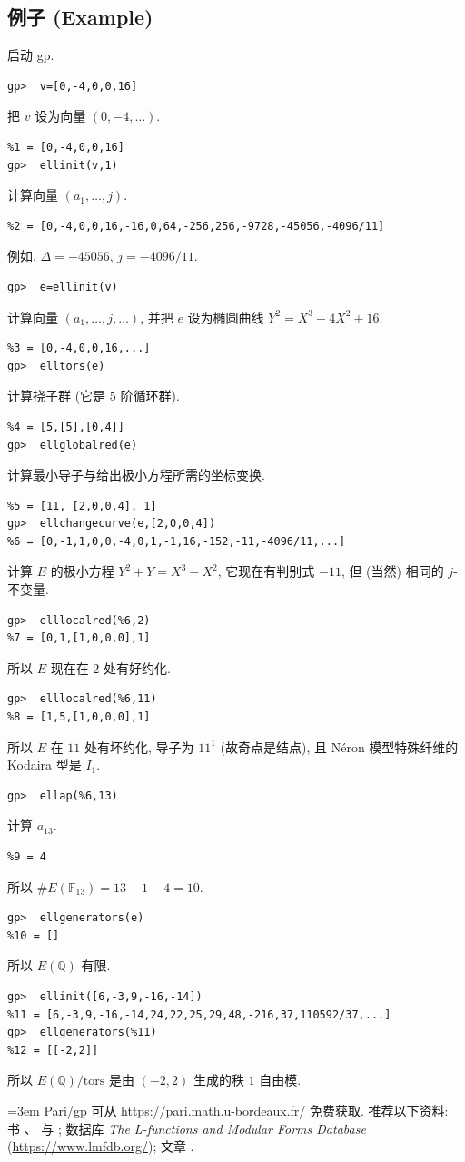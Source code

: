 \subsection*{例子 (Example)}

启动 gp.
\begin{verbatim}
gp>  v=[0,-4,0,0,16]
\end{verbatim}
把 $v$ 设为向量 $(0,-4,\dots)$.
\begin{verbatim}
%1 = [0,-4,0,0,16]
gp>  ellinit(v,1)
\end{verbatim}
计算向量 $(a_1,\dots,j)$.
\begin{verbatim}
%2 = [0,-4,0,0,16,-16,0,64,-256,256,-9728,-45056,-4096/11]
\end{verbatim}
例如, $\Delta = -45056$, $j = -4096/11$.
\begin{verbatim}
gp>  e=ellinit(v)
\end{verbatim}
计算向量 $(a_1,\dots,j,\dots)$, 并把 $e$ 设为椭圆曲线 $Y^2 = X^3 - 4X^2 + 16$.
\begin{verbatim}
%3 = [0,-4,0,0,16,...]
gp>  elltors(e)
\end{verbatim}
计算挠子群 (它是 $5$ 阶循环群).
\begin{verbatim}
%4 = [5,[5],[0,4]]
gp>  ellglobalred(e)
\end{verbatim}
计算最小导子与给出极小方程所需的坐标变换.
\begin{verbatim}
%5 = [11, [2,0,0,4], 1]
gp>  ellchangecurve(e,[2,0,0,4])
%6 = [0,-1,1,0,0,-4,0,1,-1,16,-152,-11,-4096/11,...]
\end{verbatim}
计算 $E$ 的极小方程 $Y^2 + Y = X^3 - X^2$, 它现在有判别式 $-11$, 但 (当然) 相同的 $j$-不变量.
\begin{verbatim}
gp>  elllocalred(%6,2)
%7 = [0,1,[1,0,0,0],1]
\end{verbatim}
所以 $E$ 现在在 $2$ 处有好约化.
\begin{verbatim}
gp>  elllocalred(%6,11)
%8 = [1,5,[1,0,0,0],1]
\end{verbatim}
所以 $E$ 在 $11$ 处有坏约化, 导子为 $11^1$ (故奇点是结点), 且 N\'eron 模型特殊纤维的 Kodaira 型是 $I_1$.
\begin{verbatim}
gp>  ellap(%6,13)
\end{verbatim}
计算 $a_{13}$.
\begin{verbatim}
%9 = 4
\end{verbatim}
所以 $\#E(\mathbb{F}_{13}) = 13 + 1 - 4 = 10$.
\begin{verbatim}
gp>  ellgenerators(e)
%10 = []
\end{verbatim}
所以 $E(\mathbb{Q})$ 有限.
\begin{verbatim}
gp>  ellinit([6,-3,9,-16,-14])
%11 = [6,-3,9,-16,-14,24,22,25,29,48,-216,37,110592/37,...]
gp>  ellgenerators(%11)
%12 = [[-2,2]]
\end{verbatim}
所以 $E(\mathbb{Q})/\mathrm{tors}$ 是由 $(-2,2)$ 生成的秩 $1$ 自由模.

{\emergencystretch=3em Pari/gp 可从 \url{https://pari.math.u-bordeaux.fr/} 免费获取. 推荐以下资料: 书 \cite{cohen1993}、\cite{cohen2000} 与 \cite{cremona1997}; 数据库 \textit{The L-functions and Modular Forms Database} (\url{https://www.lmfdb.org/}); 文章 \cite{best2020}.\par}
